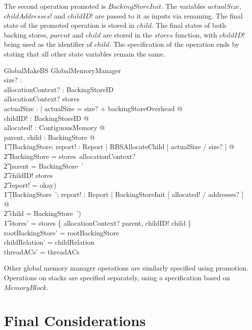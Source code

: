 \documentclass[a4paper,10pt]{report}
\begin{document}
The second operation promoted is $BackingStoreInit$. The variables
$actualSize$, $childAddresses!$ and $childID!$ are passed to it as inputs via
renaming. The final state of the promoted operation is stored in $child$.  The final 
states of both backing stores, $parent$ and $child$ are stored in the $stores$
function, with $childID!$ being used as the identifier of $child$. The 
specification of the operation ends by stating that all other state variables
remain the same.
%
\begin{schema}{GlobalMakeBS}
  \Delta GlobalMemoryManager \\
  size? : \nat \\
  allocationContext? : BackingStoreID \\
\where
  allocationContext? \in \dom stores \\
  \exists actualSize : \nat | actualSize = size? + backingStoreOverhead @ \\
  \exists childID! : BackingStoreID @ \\
  \exists allocated! : ContiguousMemory @ \\
  \exists parent, child : BackingStore @ \\
  \t1 (\exists \Delta BackingStore; report! : Report | RBSAllocateChild [ actualSize / size? ] @ \\
    \t2 \theta BackingStore = stores~allocationContext? \land \\
    \t2 parent = \theta BackingStore~' \land \\
    \t2 childID! \notin \dom stores \land \\
    \t2 report! = okay) \land \\
  \t1 (\exists BackingStore~'; report! : Report | BackingStoreInit [ allocated! / addresses? ] @ \\
    \t2 child = \theta BackingStore~') \land \\
  \t1 stores' = stores \oplus \{ allocationContext? \mapsto parent, childID! \mapsto child \} \\
  rootBackingStore' = rootBackingStore \\
  childRelation' = childRelation \\
  threadACs' = threadACs \\
\end{schema}
%
Other global memory manager operations are similarly specified using
promotion. Operations on stacks are specified separately, using a
specification based on $MemoryBlock$.

\section{Final Considerations}
\end{document}
